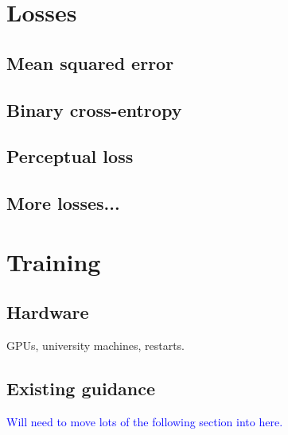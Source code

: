 \section{Losses}

\subsection{Mean squared error}

\subsection{Binary cross-entropy}

\subsection{Perceptual loss}

\subsection{More losses...}

\section{Training}

\subsection{Hardware}
GPUs, university machines, restarts.

\subsection{Existing guidance}
\textcolor{blue}{Will need to move lots of the following section into here.}

